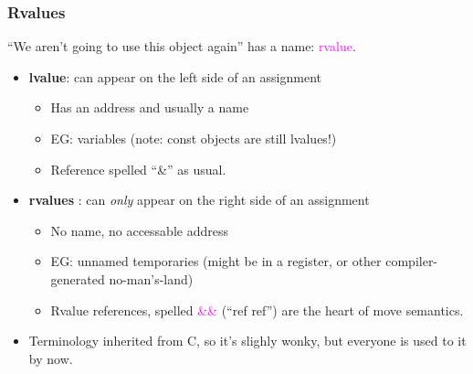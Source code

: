 \begin{frame}[fragile]
\frametitle{Rvalues}

``We aren't going to use this object again'' has a
name: \textcolor{magenta} {rvalue}.


\pause
{
\vskip 6pt

\begin{itemize}[<+->]

\item {\bf lvalue}: can appear on the left side of an assignment
\begin{itemize}     
  \item Has an address and usually a name
  \item EG: variables (note: const objects are still lvalues!)
  \item Reference spelled ``\&'' as usual.
\end{itemize}

\vskip 6pt

\item {\bf rvalues} : can \emph{only} appear on the right side of an assignment
  \begin{itemize}
  \item No name, no accessable address
  \item EG: unnamed temporaries (might be in a register, or other
  compiler-generated no-man's-land)
  \item Rvalue references, spelled \textcolor{magenta}{\&\&} (``ref ref'') are the heart of move semantics.
  \end{itemize}

\vskip 6pt

\item Terminology inherited from C, so it's slighly wonky, but
  everyone is used to it by now.

\end{itemize}
}

\end{frame}


